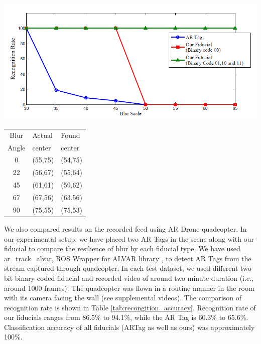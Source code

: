 \documentclass[runningheads]{llncs}
\begin{document}
\noindent\begin{minipage}{\linewidth}
\noindent\begin{minipage}{0.67\linewidth}
\includegraphics[width=\linewidth]{recognition_rate.png}
\label{fig:recognition_rate}
\end{minipage}
\noindent\begin{minipage}{0.32\linewidth}
\begin{tabularx}{\textwidth}{|c|Y|Y|}
\small{Blur} & \small{Actual} & \small{Found} \\
\small{Angle} & \small{center} & \small{center} \\
0 & (55,75) & (54,75) \\
22 & (56,67) & (55,64) \\
45 & (61,61) & (59,62) \\
67 & (67,56) & (63,56) \\
90 & (75,55) & (75,53) \\  
\end{tabularx}
\label{tab:blur_angle_center}
\end{minipage}
\end{minipage}

We also compared results on the recorded feed using AR Drone quadcopter. In our
experimental setup, we have placed two AR Tags in the scene along with our fiducial  to
compare the resilience of blur by each fiducial type. We have used
ar\_track\_alvar, ROS Wrapper for ALVAR library \cite{ros_alvar}, to detect AR
Tags from the stream captured through quadcopter. In each test dataset, we used
different two bit binary coded fiducial and recorded video of around two minute
duration (i.e., around 1000 frames).   The quadcopter was flown in a routine
manner in the room with its camera facing the wall (see supplemental
videos). The comparison of recognition rate is shown in Table
\ref{tab:recongition_accuracy}. Recognition rate of our fiducials ranges from
86.5\% to 94.1\%, while the AR Tag is 60.3\% to 65.6\%. Classification
accuracy of all fiducials (ARTag as well as ours) was approximately 100\%. 
\end{document}

